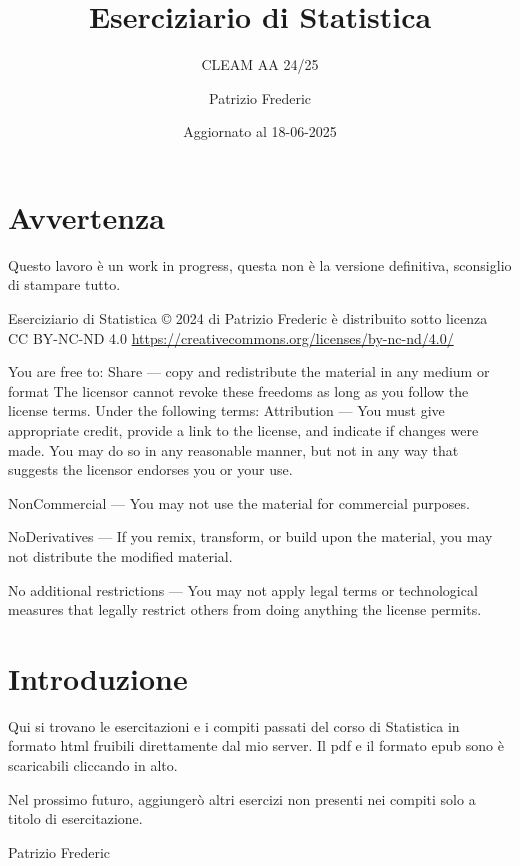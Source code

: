 \documentclass[
  11pt,
]{book}
\title{Eserciziario di Statistica}
\subtitle{CLEAM AA 24/25}
\author{Patrizio Frederic}
\date{Aggiornato al 18-06-2025}
\theoremstyle{mytheoremstyle}
\theoremstyle{mydefstyle}
\begin{document}
\maketitle

{
\setcounter{tocdepth}{1}
\tableofcontents
}
\chapter*{Avvertenza}\label{avvertenza}

\large

Questo lavoro è un work in progress, questa non è la versione definitiva, sconsiglio di stampare tutto.

\normalsize

Eserciziario di Statistica © 2024 di Patrizio Frederic è distribuito
sotto licenza CC BY-NC-ND 4.0
\url{https://creativecommons.org/licenses/by-nc-nd/4.0/}

You are free to:
Share --- copy and redistribute the material in any medium or format
The licensor cannot revoke these freedoms as long as you follow the license terms.
Under the following terms:
Attribution --- You must give appropriate credit, provide a link to the license, and indicate if changes were made. You may do so in any reasonable manner, but not in any way that suggests the licensor endorses you or your use.

NonCommercial --- You may not use the material for commercial purposes.

NoDerivatives --- If you remix, transform, or build upon the material, you may not distribute the modified material.

No additional restrictions --- You may not apply legal terms or technological measures that legally restrict others from doing anything the license permits.

\chapter*{Introduzione}\label{introduzione}

Qui si trovano le esercitazioni e i compiti passati del corso di Statistica
in formato html fruibili direttamente dal mio server.
Il pdf e il formato epub sono è scaricabili cliccando in alto.

Nel prossimo futuro, aggiungerò altri esercizi non presenti nei compiti solo a titolo
di esercitazione.

Patrizio Frederic
\end{document}
